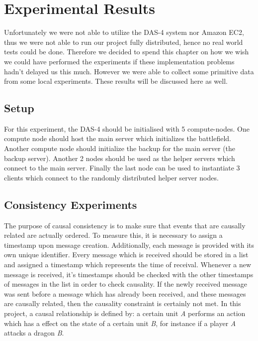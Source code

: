 \section{Experimental Results}
Unfortunately we were not able to utilize the DAS-4 system nor Amazon EC2, thus we were not able to run our project fully distributed, hence no real world tests could be done. Therefore we decided to spend this chapter on how we wish we could have performed the experiments if these implementation problems hadn't delayed us this much. However we were able to collect some primitive data from some local experiments. These results will be discussed here as well.

\subsection{Setup}
For this experiment, the DAS-4 should be initialised with 5 compute-nodes. 
One compute node should host the main server which initializes the battlefield. 
Another compute node should initialize the backup for the main server (the backup server). 
Another 2 nodes should be used as the helper servers which connect to the main server. 
Finally the last node can be used to instantiate 3 clients which connect to the randomly distributed helper server nodes.

\subsection{Consistency Experiments}
The purpose of causal consistency is to make sure that events that are causally related are actually ordered. 
To measure this, it is necessary to assign a timestamp upon message creation. 
Additionally, each message is provided with its own unique identifier. 
Every message which is received should be stored in a list and assigned a timestamp which represents the time of receival.
Whenever a new message is received, it's timestamps should be checked with the other timestamps of messages in the list in order to check causality. If the newly received message was sent before a message which has already been received, and these messages are causally related, then the causality constraint is certainly not met.
In this project, a causal relationship is defined by: a certain unit \emph{A} performs an action which has a effect on the state of a certain unit \emph{B}, for instance if a player \emph{A} attacks a dragon \emph{B}.

